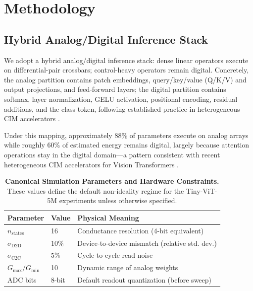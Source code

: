 \section{Methodology}
\label{sec:methodology}

\subsection{Hybrid Analog/Digital Inference Stack}
\label{subsec:hybrid-deployment}

We adopt a hybrid analog/digital inference stack: dense linear operators execute on differential-pair crossbars; control-heavy operators remain digital. Concretely, the analog partition contains patch embeddings, query/key/value (Q/K/V) and output projections, and feed-forward layers; the digital partition contains softmax, layer normalization, GELU activation, positional encoding, residual additions, and the class token, following established practice in heterogeneous CIM accelerators \citep{wu2023bwq,wang2024epim,ge2024allspark,wang2025hemlet,liu2024hardsea}.

Under this mapping, approximately 88\% of parameters execute on analog arrays while roughly 60\% of estimated energy remains digital, largely because attention operations stay in the digital domain---a pattern consistent with recent heterogeneous CIM accelerators for Vision Transformers \citep{liu2024hardsea,wang2024epim,ge2024allspark,wang2025hemlet}.

\begin{table}[htbp]
\centering
\caption{\textbf{Canonical Simulation Parameters and Hardware Constraints.} These values define the default non-ideality regime for the Tiny-ViT-5M experiments unless otherwise specified.}
\label{tab:hardware_constraints}
\begin{tabular}{lll}
\toprule
\textbf{Parameter} & \textbf{Value} & \textbf{Physical Meaning} \\
\midrule
$n_{\mathrm{states}}$ & 16 & Conductance resolution (4-bit equivalent) \\
$\sigma_{\mathrm{D2D}}$ & 10\% & Device-to-device mismatch (relative std. dev.) \\
$\sigma_{\mathrm{C2C}}$ & 5\% & Cycle-to-cycle read noise \\
$G_{\max}/G_{\min}$ & 10 & Dynamic range of analog weights \\
ADC bits & 8-bit & Default readout quantization (before sweep) \\
\bottomrule
\end{tabular}
\end{table}

